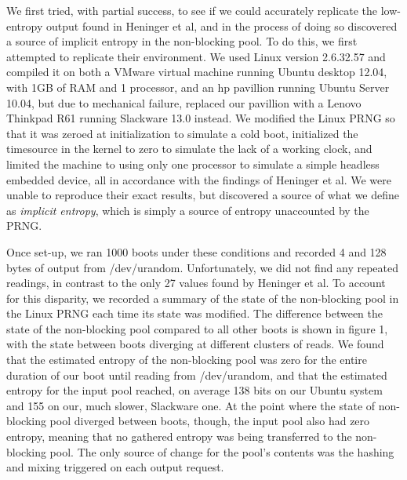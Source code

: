 We first tried, with partial success, to see if we could accurately replicate the low-entropy output found in Heninger et al, and in the process of doing so discovered a source of implicit entropy in the non-blocking pool.  To do this, we first attempted to replicate their environment.  We used Linux version 2.6.32.57 and compiled it on both a VMware virtual machine running Ubuntu desktop 12.04, with 1GB of RAM and 1 processor, and an hp pavillion running Ubuntu Server 10.04, but due to mechanical failure, replaced our pavillion with a Lenovo Thinkpad R61 running Slackware 13.0 instead. We modified the Linux PRNG so that it was zeroed at initialization to simulate a cold boot, initialized the timesource in the kernel to zero to simulate the lack of a working clock, and limited the machine to using only one processor to simulate a simple headless embedded device, all in accordance with the findings of Heninger et al.  We were unable to reproduce their exact results, but discovered a source of what we define as \textit{implicit entropy}, which is simply a source of entropy unaccounted by the PRNG. 

Once set-up, we ran 1000 boots under these conditions and recorded 4 and 128 bytes of output from /dev/urandom.  Unfortunately, we did not find any repeated readings, in contrast to the only 27 values found by Heninger et al. To account for this disparity, we recorded a summary of the state of the non-blocking pool in the Linux PRNG each time its state was modified.  The difference between the state of the non-blocking pool compared to all other boots is shown in figure 1, with the state between boots diverging at different clusters of reads.  We found that the estimated entropy of the non-blocking pool was zero for the entire duration of our boot until reading from /dev/urandom, and that the estimated entropy for the input pool reached, on average 138 bits on our Ubuntu system and 155 on our, much slower, Slackware one.  At the point where the state of non-blocking pool diverged between boots, though, the input pool also had zero entropy, meaning that no gathered entropy was being transferred to the non-blocking pool.  The only source of change for the pool's contents was the hashing and mixing triggered on each output request. 

